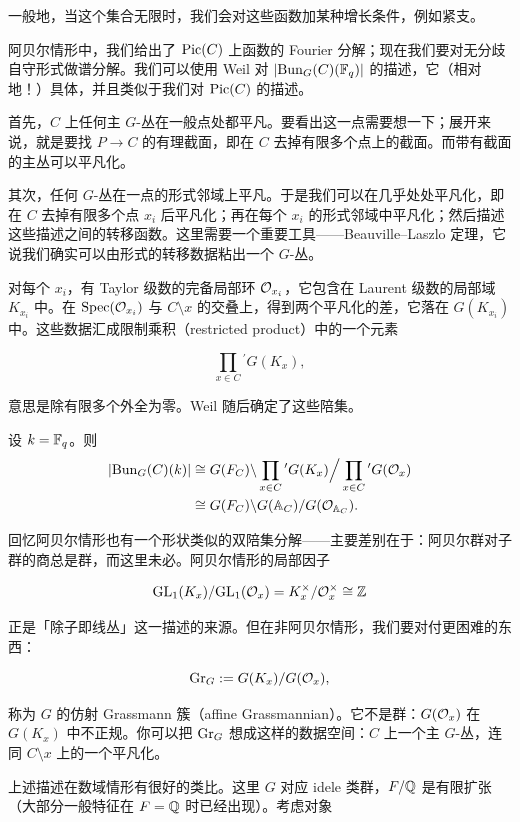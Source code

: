 一般地，当这个集合无限时，我们会对这些函数加某种增长条件，例如紧支。

阿贝尔情形中，我们给出了 $\operatorname{Pic}(C)$ 上函数的 Fourier 分解；现在我们要对无分歧自守形式做谱分解。我们可以使用 Weil 对 $|\mathrm{Bun}_G(C)(\mathbb{F}_q)|$ 的描述，它（相对地！）具体，并且类似于我们对 $\operatorname{Pic}(C)$ 的描述。

首先，$C$ 上任何主 $G$-丛在一般点处都平凡。要看出这一点需要想一下；展开来说，就是要找 $P\to C$ 的有理截面，即在 $C$ 去掉有限多个点上的截面。而带有截面的主丛可以平凡化。

其次，任何 $G$-丛在一点的形式邻域上平凡。于是我们可以在几乎处处平凡化，即在 $C$ 去掉有限多个点 $x_i$ 后平凡化；再在每个 $x_i$ 的形式邻域中平凡化；然后描述这些描述之间的转移函数。这里需要一个重要工具——Beauville–Laszlo 定理，它说我们确实可以由形式的转移数据粘出一个 $G$-丛。

对每个 $x_i$，有 Taylor 级数的完备局部环 $\mathcal{O}_{x_i}$，它包含在 Laurent 级数的局部域 $K_{x_i}$ 中。在 $\operatorname{Spec}(\mathcal{O}_{x_i})$ 与 $C\setminus x$ 的交叠上，得到两个平凡化的差，它落在 $G(K_{x_i})$ 中。这些数据汇成限制乘积（restricted product）中的一个元素

\[\prod_{x\in C}{}^{\prime} G(K_x),\]

意思是除有限多个外全为零。Weil 随后确定了这些陪集。

\begin{theorem}[Weil]
设 $k=\mathbb{F}_q$。则
\begin{align*}
|\mathrm{Bun}_G(C)(k)| &\cong G(F_C)\backslash \prod_{x\in C}{}^{\prime} G(K_x)\Big/ \prod_{x\in C}{}^{\prime} G(\mathcal{O}_x)\\
&\cong G(F_C)\backslash G(\mathbb{A}_C)/G(\mathcal{O}_{\mathbb{A}_C}).
\end{align*}
\end{theorem}

回忆阿贝尔情形也有一个形状类似的双陪集分解——主要差别在于：阿贝尔群对子群的商总是群，而这里未必。阿贝尔情形的局部因子

\[\mathrm{GL}_1(K_x)/\mathrm{GL}_1(\mathcal{O}_x)=K_x^\times/\mathcal{O}_x^\times\cong \mathbb{Z}\]

正是「除子即线丛」这一描述的来源。但在非阿贝尔情形，我们要对付更困难的东西：

\[\mathrm{Gr}_G:=G(K_x)/G(\mathcal{O}_x),\]

称为 $G$ 的仿射 Grassmann 簇（affine Grassmannian）。它不是群：$G(\mathcal{O}_x)$ 在 $G(K_x)$ 中不正规。你可以把 $\mathrm{Gr}_G$ 想成这样的数据空间：$C$ 上一个主 $G$-丛，连同 $C\setminus x$ 上的一个平凡化。

上述描述在数域情形有很好的类比。这里 $G$ 对应 idele 类群，$F/\mathbb{Q}$ 是有限扩张（大部分一般特征在 $F=\mathbb{Q}$ 时已经出现）。考虑对象

